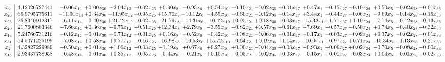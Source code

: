 \documentclass[9pt]{article}
\begin{document}
 \[\begin{array}{c| c c@{\hskip 2pt} c@{\hskip 2pt} c@{\hskip 2pt} c@{\hskip 2pt} c@{\hskip 2pt} c@{\hskip 2pt} c@{\hskip 2pt} c@{\hskip 2pt} c@{\hskip 2pt} c@{\hskip 2pt} c@{\hskip 2pt} c@{\hskip 2pt} c@{\hskip 2pt} c@{\hskip 2pt} c@{\hskip 2pt} c@{\hskip 2pt} }
 x_{9}   &  4.12026727441 & -0.06 x_{14} & +  0.00 x_{30} & -2.04 x_{12} & +  0.02 x_{25} & +  0.90 x_{8} & -0.93 x_{6} & +  0.54 x_{10} & -0.10 x_{21} & -0.02 x_{35} & -0.01 x_{17} & +  0.47 x_{1} & -0.15 x_{27} & -0.10 x_{24} & +  0.50 x_{5} & -0.02 x_{28} & -0.01 x_{33}\\
 x_{26}   &  66.9795775611 & -11.90 x_{14} & +  0.34 x_{30} & -11.95 x_{12} & +  0.95 x_{25} & + 15.70 x_{8} & -10.12 x_{6} & -4.55 x_{10} & -0.60 x_{21} & -0.12 x_{35} & -0.14 x_{17} & +  3.44 x_{1} & -0.44 x_{27} & -0.06 x_{24} & -9.69 x_{5} & -0.14 x_{28} & -0.16 x_{33}\\
 x_{23}   &  26.8340912317 & +  6.11 x_{14} & -0.40 x_{30} & + 21.42 x_{12} & -0.02 x_{25} & -21.79 x_{8} & + 14.31 x_{6} & -10.42 x_{10} & +  0.95 x_{21} & +  0.18 x_{35} & +  0.03 x_{17} & -15.32 x_{1} & +  1.71 x_{27} & +  1.10 x_{24} & -7.74 x_{5} & -0.42 x_{28} & +  0.13 x_{33}\\
 x_{20}   &  21.7600883346 & +  7.66 x_{14} & +  0.36 x_{30} & -9.75 x_{12} & +  0.51 x_{25} & + 12.34 x_{8} & +  2.79 x_{6} & -3.55 x_{10} & -0.82 x_{21} & +  0.57 x_{35} & +  0.61 x_{17} & -7.69 x_{1} & -0.57 x_{27} & -0.50 x_{24} & +  0.74 x_{5} & -0.40 x_{28} & +  0.32 x_{33}\\
 x_{13}   &  5.24766731216 & +  0.12 x_{14} & -0.01 x_{30} & -0.73 x_{12} & +  0.01 x_{25} & +  0.16 x_{8} & -0.52 x_{6} & -0.42 x_{10} & -0.08 x_{21} & -0.06 x_{35} & -0.01 x_{17} & -0.17 x_{1} & -0.03 x_{27} & -0.09 x_{24} & +  0.37 x_{5} & -0.02 x_{28} & -0.01 x_{33}\\
 x_{31}   &  54.5071225199 & +  7.08 x_{14} & +  0.58 x_{30} & +  9.77 x_{12} & -0.16 x_{25} & -16.98 x_{8} & + 16.53 x_{6} & + 15.72 x_{10} & -0.64 x_{21} & +  0.19 x_{35} & +  1.14 x_{17} & -10.07 x_{1} & +  0.97 x_{27} & +  0.71 x_{24} & -15.34 x_{5} & -1.13 x_{28} & -0.21 x_{33}\\
 x_{2}   &  4.32827229989 & +  0.50 x_{14} & +  0.01 x_{30} & +  1.06 x_{12} & -0.03 x_{25} & -1.19 x_{8} & +  0.67 x_{6} & +  0.27 x_{10} & +  0.00 x_{21} & -0.04 x_{35} & +  0.03 x_{17} & -0.93 x_{1} & +  0.06 x_{27} & +  0.02 x_{24} & -0.70 x_{5} & -0.08 x_{28} & -0.00 x_{33}\\
 x_{15}   &  2.93437738958 & +  0.48 x_{14} & -0.01 x_{30} & +  0.35 x_{12} & -0.05 x_{25} & -0.44 x_{8} & -0.21 x_{6} & +  0.10 x_{10} & -0.05 x_{21} & -0.02 x_{35} & +  0.03 x_{17} & -0.15 x_{1} & -0.01 x_{27} & -0.03 x_{24} & +  0.04 x_{5} & -0.01 x_{28} & -0.02 x_{33}\\

\end{array}\]
\end{document}
